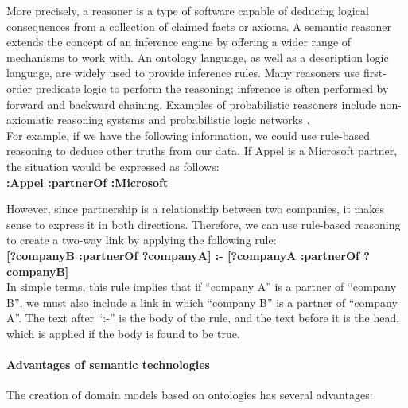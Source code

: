             More precisely, a reasoner is a type of software capable of deducing logical consequences from a collection of claimed facts or axioms. A semantic reasoner extends the concept of an inference engine by offering a wider range of mechanisms to work with. An ontology language, as well as a description logic language, are widely used to provide inference rules. Many reasoners use first-order predicate logic to perform the reasoning; inference is often performed by forward and backward chaining. Examples of probabilistic reasoners include non-axiomatic reasoning systems\cite{wang2000non} and probabilistic logic networks \cite{qu2019probabilistic}.\\
        
            For example, if we have the following information, we could use rule-based reasoning to deduce other truths from our data. If Appel is a Microsoft partner, the situation would be expressed as follows:\\
        
            \textbf{:Appel :partnerOf :Microsoft}
            
            However, since partnership is a relationship between two companies, it makes sense to express it in both directions. Therefore, we can use rule-based reasoning to create a two-way link by applying the following rule:\\
        
            \textbf{[?companyB :partnerOf ?companyA] :- [?companyA :partnerOf ?companyB]}\\
        
            In simple terms, this rule implies that if “company A” is a partner of “company B”, we must also include a link in which “company B” is a partner of “company A”. The text after “:-” is the body of the rule, and the text before it is the head, which is applied if the body is found to be true.


            \paragraph{Advantages of semantic technologies}
            The creation of domain models based on ontologies has several advantages: 
        
